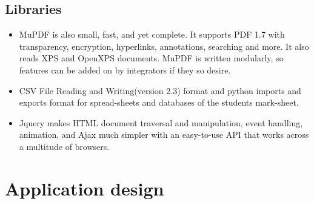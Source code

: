 \documentclass[10pt,a4paper]{article}
\begin{document}
\textbf {\textbf{}}
\subsection{Libraries}
\begin{itemize}
\item {	MuPDF is also small, fast, and yet complete. It supports PDF 1.7 with transparency, encryption, hyperlinks, annotations, searching and more. It also reads XPS and OpenXPS documents. MuPDF is written modularly, so features can be added on by integrators if they so desire.}
\item {CSV File Reading and Writing(version 2.3) format and python  imports and exports format for spread-sheets and databases of the students mark-sheet.}
\item {	Jquery makes  HTML document traversal and manipulation, event handling, animation, and Ajax much simpler with an easy-to-use API that works across a multitude of browsers.}
\end{itemize}

\section{Application design}
\end{document}
